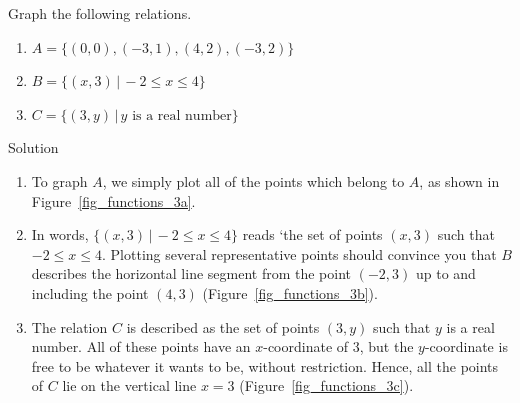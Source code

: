\begin{example}
 Graph the following relations. \label{relationgraphingexample}



\begin{multicols}{2}
\begin{enumerate}
\ifvc
\item  $A = \{ (0,0), (-3,1), (4,2), (-3,2)\}$
\fi
\item  $B = \{ (x,3) \, | \, -2 \leq x \leq 4\}$
\item  $C = \{ (3,y) \, | \, \mbox{$y$ is a real number} \}$
\end{enumerate}
\end{multicols}

\ifvc\pagebreak\fi
{}Solution 

\begin{enumerate}
\ifvc
\item  To graph $A$, we simply plot all of the points which belong to $A$, as shown in Figure~\ref{fig_functions_3a}.
\fi
\item  In words,  $\{ (x,3)\, | \, -2 \leq x \leq 4 \}$  reads `the set of points $(x,3)$ such that $-2 \leq x \leq 4$. Plotting several representative points should convince you that $B$ describes the horizontal line segment from the point $(-2,3)$ up to and including the point $(4,3)$ (Figure~\ref{fig_functions_3b}).
\item  The relation $C$ is  described as the set of points $(3,y)$ such that $y$ is a real number.  All of these points have an $x$-coordinate of $3$, but the $y$-coordinate is free to be whatever it wants to be, without restriction. Hence, all the points of $C$ lie on the vertical line  $x = 3$ (Figure~\ref{fig_functions_3c}).  

\end{enumerate}


\end{example}
